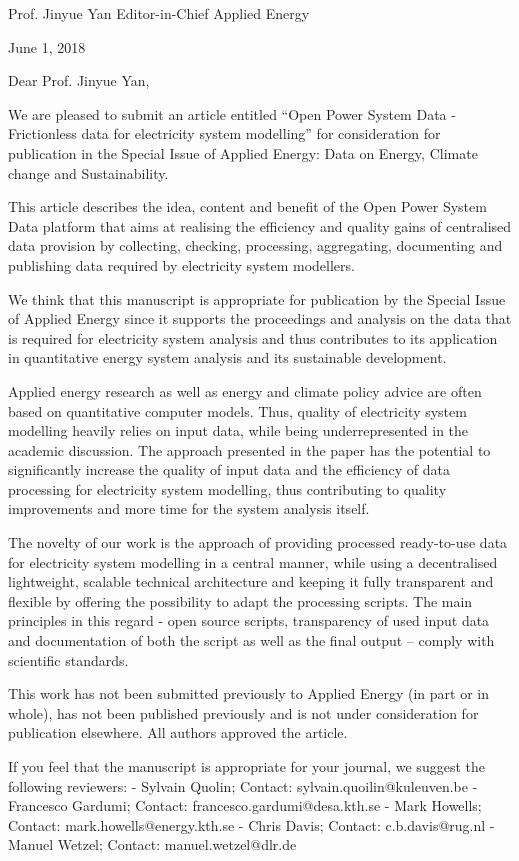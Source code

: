 Prof. Jinyue Yan 
Editor-in-Chief
Applied Energy


June 1, 2018

Dear Prof. Jinyue Yan,

We are pleased to submit an article entitled “Open Power System Data - Frictionless data for electricity system modelling” for consideration for publication in the Special Issue of Applied Energy: Data on Energy, Climate change and Sustainability.

This article describes the idea, content and benefit of the Open Power System Data platform that aims at realising the efficiency and quality gains of centralised data provision by collecting, checking, processing, aggregating, documenting and publishing data required by electricity system modellers. 

We think that this manuscript is appropriate for publication by the Special Issue of Applied Energy since it supports the proceedings and analysis on the data that is required for electricity system analysis and thus contributes to its application in quantitative energy system analysis and its sustainable development.

Applied energy research as well as energy and climate policy advice are often based on quantitative computer models. Thus, quality of electricity system modelling heavily relies on input data, while being underrepresented in the academic discussion. The approach presented in the paper has the potential to significantly increase the quality of input data and the efficiency of data processing for electricity system modelling, thus contributing to quality improvements and more time for the system analysis itself.

The novelty of our work is the approach of providing processed ready-to-use data for electricity system modelling in a central manner, while using a decentralised lightweight, scalable technical architecture and keeping it fully transparent and flexible by offering the possibility to adapt the processing scripts. The main principles in this regard - open source scripts, transparency of used input data and documentation of both the script as well as the final output – comply with scientific standards.

This work has not been submitted previously to Applied Energy (in part or in whole), has not been published previously and is not under consideration for publication elsewhere. All authors approved the article.

If you feel that the manuscript is appropriate for your journal, we suggest the following reviewers:
-	Sylvain Quolin; Contact: sylvain.quoilin@kuleuven.be
-	Francesco Gardumi; Contact: francesco.gardumi@desa.kth.se
-	Mark Howells; Contact: mark.howells@energy.kth.se
-	Chris Davis; Contact: c.b.davis@rug.nl
-	Manuel Wetzel; Contact: manuel.wetzel@dlr.de


